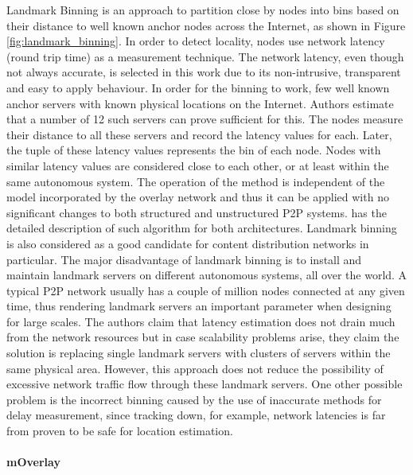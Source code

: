 \documentclass[acmcsur,acmnow]{acmtrans2m}
\begin{document}
Landmark Binning \cite{ratnasamy_binning_2002} is an approach to partition close
by nodes into bins based on their distance to well known anchor nodes across the Internet, as shown in Figure \ref{fig:landmark_binning}. In order to detect locality, nodes use network latency (round trip
time) as a measurement technique. The network latency, even though not always
accurate, is selected in this work due to its non-intrusive, transparent and
easy to apply behaviour. In order for the binning to work, few well known anchor servers with known physical locations on the Internet. Authors estimate that a number of 12 such servers can prove sufficient for this. The nodes measure their distance to all these servers and record the latency values for each. Later, the tuple of these latency values represents the bin of each node. Nodes with similar latency values are considered close to each other, or at least within the same autonomous system. The operation of the method is independent of the model incorporated by the overlay network and thus it can be applied with no significant changes to both structured and unstructured P2P systems. \cite{ratnasamy_binning_2002} has the detailed description of such algorithm for both architectures. Landmark binning is also considered as a good candidate for content distribution networks in particular. The major disadvantage of landmark
binning is to install and maintain landmark servers on different autonomous systems, all over the world.  A typical P2P network usually has a couple of million nodes
connected at any given time, thus rendering landmark servers an important parameter when designing for large scales.  The authors claim that latency estimation does not drain
much from the network resources but in case scalability problems arise, they claim the solution is replacing single landmark servers with clusters of servers
within the same physical area. However, this approach does not reduce the
possibility of excessive network traffic flow through these landmark servers. One other
possible problem is the incorrect binning caused by the use of inaccurate methods for delay measurement, since tracking down, for example, network latencies is far from proven to be safe for location estimation.


\paragraph*{\bf mOverlay}
\end{document}
